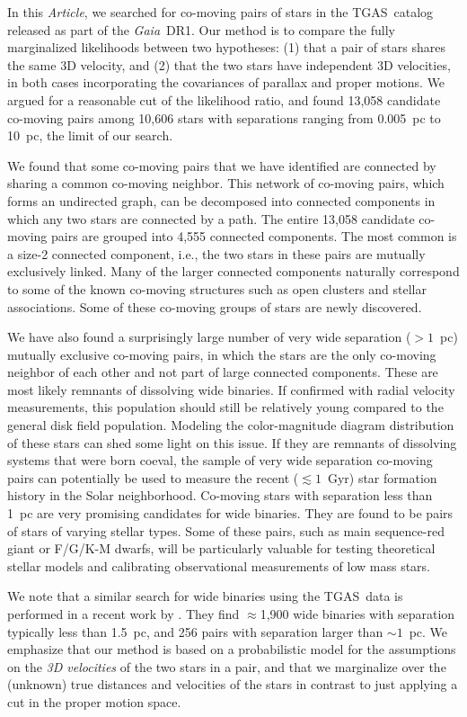 \documentclass[manuscript, letterpaper]{aastex6}
\newcommand{\project}[1]{\textsl{#1}}
\newcommand{\acronym}[1]{{\small{#1}}}
\newcommand{\gaia}{\project{Gaia}}
\newcommand{\documentname}{\textsl{Article}}
\newcommand{\tgas}{\acronym{TGAS}}
\begin{document}
In this \documentname, we searched for co-moving pairs of stars in the
\tgas\ catalog released as part of the \gaia\ DR1.
Our method is to compare the fully marginalized likelihoods between two
hypotheses: (1) that a pair of
stars shares the same 3D velocity, and (2) that the two stars have independent
3D velocities, in both cases incorporating the covariances of parallax and
proper motions.
We argued for a reasonable cut of the likelihood ratio, and found
13,058 candidate co-moving pairs among 10,606 stars
with separations ranging from 0.005~pc to 10~pc, the limit of our search.

We found that some co-moving pairs that we have identified are connected
by sharing a common co-moving neighbor.
This network of co-moving pairs, which forms an undirected graph,
can be decomposed into connected components in which any two stars are connected
by a path.
The entire 13,058 candidate co-moving pairs are grouped into 4,555 connected
components. The most common is a size-2 connected component, i.e., the two
stars in these pairs are mutually exclusively linked.
Many of the larger connected components
naturally correspond to some of the known co-moving structures
such as open clusters and stellar associations.
Some of these co-moving groups of stars are newly discovered.

We have also found a surprisingly large number of very wide separation ($>1$~pc)
mutually exclusive co-moving pairs, in which the stars are the only co-moving neighbor
of each other and not part of large connected components.
These are most likely remnants of dissolving wide binaries.
If confirmed with radial velocity measurements, this population should still be
relatively young compared to the general disk field population.
Modeling the color-magnitude diagram distribution of these stars can shed some
light on this issue.
If they are remnants of dissolving systems that were born coeval,
the sample of very wide separation co-moving pairs can potentially be used
to measure the recent ($\lesssim 1$~Gyr)
star formation history in the Solar neighborhood.
Co-moving stars with separation less than 1~pc are very promising candidates
for wide binaries. They are found to be pairs of stars of varying stellar types.
Some of these pairs, such as main sequence-red giant or F/G/K-M dwarfs,
will be particularly valuable for testing theoretical
stellar models and calibrating observational measurements of low mass stars.

We note that a similar search for wide binaries using the \tgas\ data is performed
in a recent work by \citet{2016arXiv161107883O}. They find $\approx$1,900 wide binaries
with separation typically less than 1.5~pc, and 256 pairs with separation larger than
$\sim 1$~pc.
We emphasize that our method is based on a probabilistic model for the assumptions
on the \emph{3D velocities} of the two stars in a pair, and that we
marginalize over the (unknown) true distances and velocities of the stars
in contrast to just applying a cut in the proper motion space.
\end{document}
